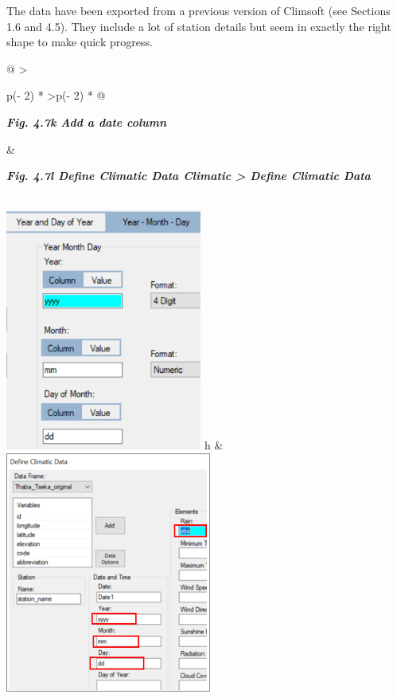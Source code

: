 \documentclass[
  letterpaper,
  DIV=11,
  numbers=noendperiod]{scrreprt}
\begin{document}
The data have been exported from a previous version of Climsoft (see
Sections 1.6 and 4.5). They include a lot of station details but seem in
exactly the right shape to make quick progress.

\begin{longtable}[]{@{}
  >{\raggedright\arraybackslash}p{(\columnwidth - 2\tabcolsep) * }
  >{\raggedleft\arraybackslash}p{(\columnwidth - 2\tabcolsep) * }@{}}
\toprule\noalign{}
\begin{minipage}[b]{\linewidth}\raggedright
\textbf{\emph{Fig. 4.7k Add a date column}}
\end{minipage} & \begin{minipage}[b]{\linewidth}\raggedleft
\textbf{\emph{Fig. 4.7l Define Climatic Data Climatic \textgreater{}
Define Climatic Data}}
\end{minipage} \\
\midrule\noalign{}
\endhead
\bottomrule\noalign{}
\endlastfoot
\includegraphics[width=2.54511in,height=3.12534in]{figures/Fig4.7k.png}
h &
\includegraphics[width=2.67072in,height=\textheight]{figures/Fig4.7l.png} \\
\end{longtable}
\end{document}
